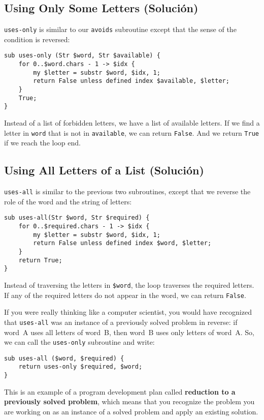 \subsection{Using Only Some Letters (Solución)}

\verb"uses-only" is similar to our {\tt avoids} subroutine 
except that the sense of the condition is reversed:

\begin{verbatim}
sub uses-only (Str $word, Str $available) {
    for 0..$word.chars - 1 -> $idx {
        my $letter = substr $word, $idx, 1;
        return False unless defined index $available, $letter;
    }
    True;
}
\end{verbatim}
%
Instead of a list of forbidden letters, we have a list 
of available letters.  If we find a letter in {\tt word} that 
is not in {\tt available}, we can return {\tt False}. And 
we return {\tt True} if we reach the loop end.

\subsection{Using All Letters of a List (Solución)}

\verb"uses-all" is similar to the previous two subroutines, 
except that we reverse the role of the word and the string 
of letters:

\begin{verbatim}
sub uses-all(Str $word, Str $required) {
    for 0..$required.chars - 1 -> $idx {
        my $letter = substr $word, $idx, 1;
        return False unless defined index $word, $letter;
    }
    return True;
}
\end{verbatim}
%
Instead of traversing the letters in {\tt \$word}, the loop
traverses the required letters.  If any of the required letters
do not appear in the word, we can return {\tt False}.

If you were really thinking like a computer scientist, you would
have recognized that \verb"uses-all" was an instance of a
previously solved problem in reverse: if word~A uses all 
letters of word~B, then word~B uses only letters of word~A. So, 
we can call the {\tt uses-only} subroutine and write:

\begin{verbatim}
sub uses-all ($word, $required) {
    return uses-only $required, $word;
}
\end{verbatim}
%
This is an example of a program development plan called 
{\bf reduction to a previously solved problem}, which means that you
recognize the problem you are working on as an instance of a solved
problem and apply an existing solution. 

